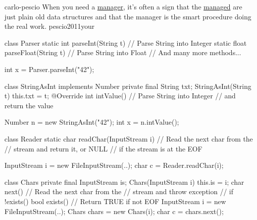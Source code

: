 \documentclass{article}
\begin{document}

\pptToc

\lnQuote
  {carlo-pescio}
  {When you need a \ul{manager}, it’s often a sign that the \ul{managed} are just plain old data structures and that the manager is the smart procedure doing the real work.}
  {pescio2011your}


\begin{lnSnippet}
class Parser {
  static int parseInt(String t) {
    // Parse String into Integer
  }
  static float parseFloat(String t) {
    // Parse String into Float
  }
  // And many more methods...
}

int x = Parser.parseInt("42");
\end{lnSnippet}
\begin{lnSnippet}
class StringAsInt implements Number {
  private final String txt;
  StringAsInt(String t) { this.txt = t; }
  @Override int intValue() {
    // Parse String into Integer
    // and return the value
  }
}

Number n = new StringAsInt("42");
int x = n.intValue();
\end{lnSnippet}

\begin{lnSnippet}
class Reader {
  static char readChar(InputStream i) {
    // Read the next char from the
    // stream and return it, or NULL
    // if the stream is at the EOF
  }
}

InputStream i = new FileInputStream(..);
char c = Reader.readChar(i);
\end{lnSnippet}
\begin{lnSnippet}
class Chars
  private final InputStream is;
  Chars(InputStream i)
    this.is = i;
  char next()
    // Read the next char from the
    // stream and throw exception
    // if !exists()
  bool exists()
    // Return TRUE if not EOF
InputStream i = new FileInputStream(..);
Chars chars = new Chars(i);
char c = chars.next();
\end{lnSnippet}
\end{document}
